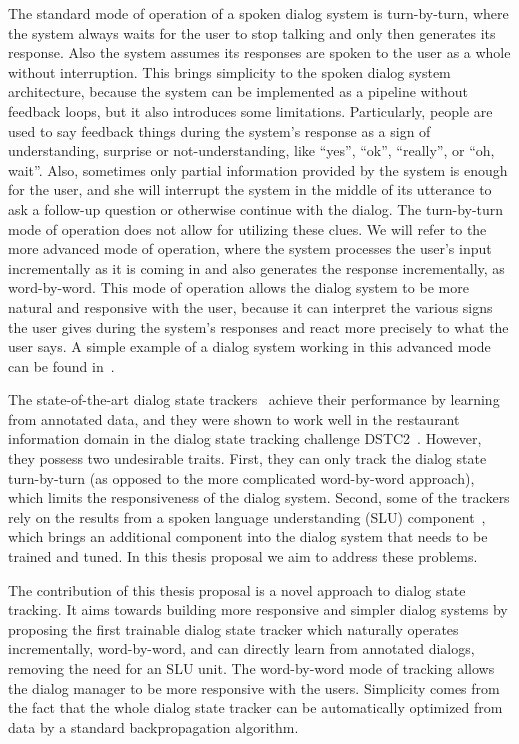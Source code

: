 \documentclass[runningheads,a4paper]{llncs}
\begin{document}
The standard mode of operation of a spoken dialog system is turn-by-turn, where the system always waits for the user to stop talking and only then generates its response. Also the system assumes its responses are spoken to the user as a whole without interruption. This brings simplicity to the spoken dialog system architecture, because the system can be implemented as a pipeline without feedback loops, but it also introduces some limitations. Particularly, people are used to say feedback things during the system's response as a sign of understanding, surprise or not-understanding, like ``yes'', ``ok'', ``really'', or ``oh, wait''. Also, sometimes only partial information provided by the system is enough for the user, and she will interrupt the system in the middle of its utterance to ask a follow-up question or otherwise continue with the dialog. The turn-by-turn mode of operation does not allow for utilizing these clues. We will refer to the more advanced mode of operation, where the system processes the user's input incrementally as it is coming in and also generates the response incrementally, as word-by-word. This mode of operation allows the dialog system to be more natural and responsive with the user, because it can interpret the various signs the user gives during the system's responses and react more precisely to what the user says. A simple example of a dialog system working in this advanced mode can be found in~\cite{skantze2009incremental}.

The state-of-the-art dialog state trackers~\cite{williams2014web,henderson2014word,lee2014optimizing,smith2014comparative,sun2014sjtu} achieve their performance by learning from annotated data, and they were shown to work well in the restaurant information domain in the dialog state tracking challenge DSTC2~\cite{henderson2014second}. However, they possess two undesirable traits. First, they can only track the dialog state turn-by-turn (as opposed to the more complicated word-by-word approach), which limits the responsiveness of the dialog system. Second, some of the trackers rely on the results from a spoken language understanding (SLU) component~\cite{wang2005spoken}, which brings an additional component into the dialog system that needs to be trained and tuned. In this thesis proposal we aim to address these problems.

The contribution of this thesis proposal is a novel approach to dialog state tracking.
It aims towards building more responsive and simpler dialog systems by proposing the first trainable dialog state tracker which naturally operates incrementally, word-by-word, and can directly learn from annotated dialogs, removing the need for an SLU unit. The word-by-word mode of tracking allows the dialog manager to be more responsive with the users. Simplicity comes from the fact that the whole dialog state tracker can be automatically optimized from data by a standard backpropagation algorithm.
\end{document}
